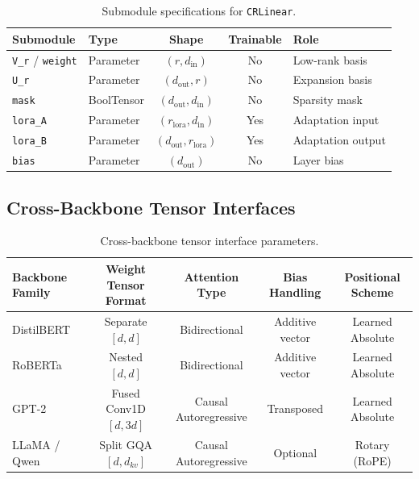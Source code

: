 \begin{table}[H]
\centering
\small
\begin{tabular}{llccp{5cm}}
\toprule
\textbf{Submodule} & \textbf{Type} & \textbf{Shape} & \textbf{Trainable} & \textbf{Role} \\
\midrule
\texttt{V\_r} / \texttt{weight} & Parameter & $(r, d_{\text{in}})$ & No & Low-rank basis \\
\texttt{U\_r} & Parameter & $(d_{\text{out}}, r)$ & No & Expansion basis \\
\texttt{mask} & BoolTensor & $(d_{\text{out}}, d_{\text{in}})$ & No & Sparsity mask \\
\texttt{lora\_A} & Parameter & $(r_{\text{lora}}, d_{\text{in}})$ & Yes & Adaptation input \\
\texttt{lora\_B} & Parameter & $(d_{\text{out}}, r_{\text{lora}})$ & Yes & Adaptation output \\
\texttt{bias} & Parameter & $(d_{\text{out}})$ & No & Layer bias \\
\bottomrule
\end{tabular}
\caption{Submodule specifications for \texttt{CRLinear}.}
\label{tab:submodules_crcompressor}
\end{table}

\subsection{Cross-Backbone Tensor Interfaces}
\begin{table}[H]
\centering
\small
\begin{tabular}{lcccc}
\toprule
\textbf{Backbone Family} & \textbf{Weight Tensor Format} & \textbf{Attention Type} & \textbf{Bias Handling} & \textbf{Positional Scheme} \\
\midrule
DistilBERT & Separate $[d, d]$ & Bidirectional & Additive vector & Learned Absolute \\
RoBERTa & Nested $[d, d]$ & Bidirectional & Additive vector & Learned Absolute \\
GPT-2 & Fused Conv1D $[d, 3d]$ & Causal Autoregressive & Transposed & Learned Absolute \\
LLaMA / Qwen & Split GQA $[d, d_{kv}]$ & Causal Autoregressive & Optional & Rotary (RoPE) \\
\bottomrule
\end{tabular}
\caption{Cross-backbone tensor interface parameters.}
\label{tab:backbone_interfaces}
\end{table}


